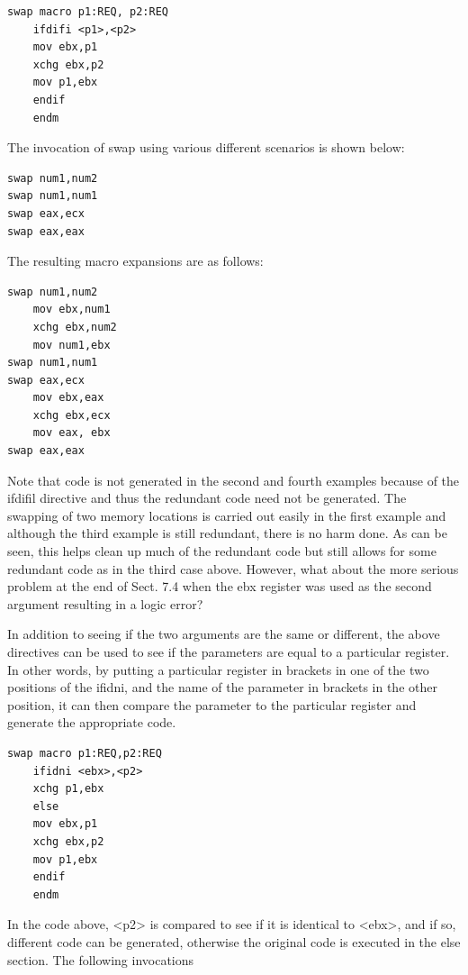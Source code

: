 \documentclass[10pt]{book}
\begin{document}
\begin{verbatim}
swap macro p1:REQ, p2:REQ
    ifdifi <p1>,<p2>
    mov ebx,p1
    xchg ebx,p2
    mov p1,ebx
    endif
    endm
\end{verbatim}

The invocation of swap using various different scenarios is shown below:

\begin{verbatim}
swap num1,num2
swap num1,num1
swap eax,ecx
swap eax,eax
\end{verbatim}

The resulting macro expansions are as follows:

\begin{verbatim}
swap num1,num2
    mov ebx,num1
    xchg ebx,num2
    mov num1,ebx
swap num1,num1
swap eax,ecx
    mov ebx,eax
    xchg ebx,ecx
    mov eax, ebx
swap eax,eax
\end{verbatim}

Note that code is not generated in the second and fourth examples because of the ifdifil directive and thus the redundant code need not be generated. The swapping of two memory locations is carried out easily in the first example and although the third example is still redundant, there is no harm done. As can be seen, this helps clean up much of the redundant code but still allows for some redundant code as in the third case above. However, what about the more serious problem at the end of Sect. 7.4 when the ebx register was used as the second argument resulting in a logic error?

In addition to seeing if the two arguments are the same or different, the above directives can be used to see if the parameters are equal to a particular register. In other words, by putting a particular register in brackets in one of the two positions of the ifidni, and the name of the parameter in brackets in the other position, it can then compare the parameter to the particular register and generate the appropriate code.

\begin{verbatim}
swap macro p1:REQ,p2:REQ
    ifidni <ebx>,<p2>
    xchg p1,ebx
    else
    mov ebx,p1
    xchg ebx,p2
    mov p1,ebx
    endif
    endm
\end{verbatim}

In the code above, <p2> is compared to see if it is identical to <ebx>, and if so, different code can be generated, otherwise the original code is executed in the else section. The following invocations
\end{document}
